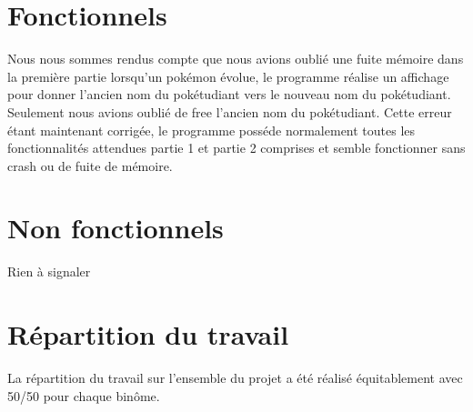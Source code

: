 \documentclass[10pt,a4paper,twocolumn]{report}
\begin{document}
\section{Fonctionnels}
Nous nous sommes rendus compte que nous avions oublié une fuite mémoire dans la première partie lorsqu'un pokémon évolue, le programme réalise un affichage pour donner l'ancien nom du pokétudiant vers le nouveau nom du pokétudiant. Seulement nous avions oublié de free l'ancien nom du pokétudiant. Cette erreur étant maintenant corrigée, le programme posséde normalement toutes les fonctionnalités attendues partie 1 et partie 2 comprises et semble fonctionner sans crash ou de fuite de mémoire.

\section{Non fonctionnels}
Rien à signaler

\section{Répartition du travail}
La répartition du travail sur l'ensemble du projet a été réalisé équitablement avec 50/50 pour chaque binôme.
\end{document}
